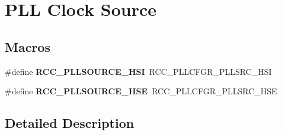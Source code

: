 \hypertarget{group___r_c_c___p_l_l___clock___source}{}\section{P\+LL Clock Source}
\label{group___r_c_c___p_l_l___clock___source}
\subsection*{Macros}
\begin{DoxyCompactItemize}
\item 
\#define {\bfseries R\+C\+C\+\_\+\+P\+L\+L\+S\+O\+U\+R\+C\+E\+\_\+\+H\+SI}~R\+C\+C\+\_\+\+P\+L\+L\+C\+F\+G\+R\+\_\+\+P\+L\+L\+S\+R\+C\+\_\+\+H\+SI\hypertarget{group___r_c_c___p_l_l___clock___source_ga0e07703f1ccb3d60f8a47a2dc631c218}{}\label{group___r_c_c___p_l_l___clock___source_ga0e07703f1ccb3d60f8a47a2dc631c218}

\item 
\#define {\bfseries R\+C\+C\+\_\+\+P\+L\+L\+S\+O\+U\+R\+C\+E\+\_\+\+H\+SE}~R\+C\+C\+\_\+\+P\+L\+L\+C\+F\+G\+R\+\_\+\+P\+L\+L\+S\+R\+C\+\_\+\+H\+SE\hypertarget{group___r_c_c___p_l_l___clock___source_ga197cea7fe5c2db26fe7fcdb0f99dd4d7}{}\label{group___r_c_c___p_l_l___clock___source_ga197cea7fe5c2db26fe7fcdb0f99dd4d7}

\end{DoxyCompactItemize}


\subsection{Detailed Description}
